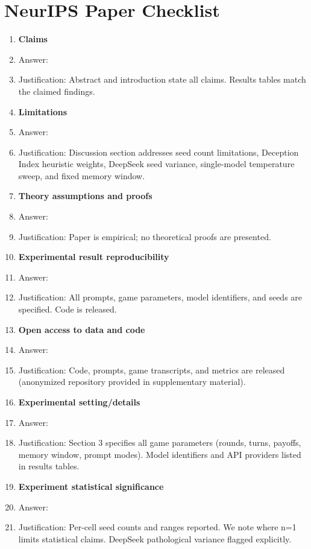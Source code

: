 \section*{NeurIPS Paper Checklist}

\begin{enumerate}

\item {\bf Claims}
    \item[] Answer: \answerYes{}
    \item[] Justification: Abstract and introduction state all claims. Results tables match the claimed findings.

\item {\bf Limitations}
    \item[] Answer: \answerYes{}
    \item[] Justification: Discussion section addresses seed count limitations, Deception Index heuristic weights, DeepSeek seed variance, single-model temperature sweep, and fixed memory window.

\item {\bf Theory assumptions and proofs}
    \item[] Answer: \answerNA{}
    \item[] Justification: Paper is empirical; no theoretical proofs are presented.

\item {\bf Experimental result reproducibility}
    \item[] Answer: \answerYes{}
    \item[] Justification: All prompts, game parameters, model identifiers, and seeds are specified. Code is released.

\item {\bf Open access to data and code}
    \item[] Answer: \answerYes{}
    \item[] Justification: Code, prompts, game transcripts, and metrics are released (anonymized repository provided in supplementary material).

\item {\bf Experimental setting/details}
    \item[] Answer: \answerYes{}
    \item[] Justification: Section 3 specifies all game parameters (rounds, turns, payoffs, memory window, prompt modes). Model identifiers and API providers listed in results tables.

\item {\bf Experiment statistical significance}
    \item[] Answer: \answerYes{}
    \item[] Justification: Per-cell seed counts and ranges reported. We note where n=1 limits statistical claims. DeepSeek pathological variance flagged explicitly.


\end{enumerate}
